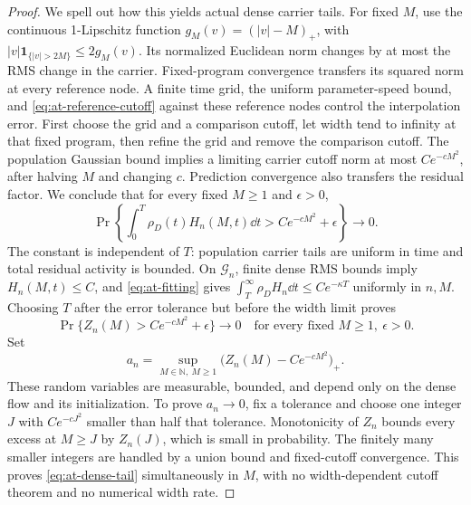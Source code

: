 \begin{proof}
We spell out how this yields actual dense carrier tails.  For fixed
$M$, use the continuous 1-Lipschitz function
$g_M(v)=(|v|-M)_+$, with
$|v|\mathbf1_{\{|v|>2M\}}\le2g_M(v)$.
Its normalized Euclidean norm changes by at most the RMS change in
the carrier.  Fixed-program convergence transfers its squared norm at
every reference node.  A finite time grid, the uniform parameter-speed
bound, and \eqref{eq:at-reference-cutoff} against these reference nodes
control the interpolation error.  First choose the grid and a comparison
cutoff, let width tend to infinity at that fixed program, then refine
the grid and remove the comparison cutoff.  The population Gaussian
bound implies a limiting carrier cutoff norm at most $Ce^{-cM^2}$,
after halving $M$ and changing $c$.  Prediction convergence also
transfers the residual factor.  We conclude that for every fixed
$M\ge1$ and $\epsilon>0$,
\[
 \Pr\left\{\int_0^T\rho_D(t)H_n(M,t)\dd t
                   >Ce^{-cM^2}+\epsilon\right\}\longrightarrow0.
\]
The constant is independent of $T$: population carrier tails are uniform
in time and total residual activity is bounded.
On $\mathcal G_n$, finite dense RMS bounds imply $H_n(M,t)\le C$,
and \eqref{eq:at-fitting} gives
$\int_T^\infty\rho_DH_n\dd t\le Ce^{-\kappa T}$
uniformly in $n,M$.  Choosing $T$ after the error tolerance but before
the width limit proves
\[
 \Pr\{Z_n(M)>Ce^{-cM^2}+\epsilon\}\longrightarrow0
 \quad\text{for every fixed }M\ge1,\ \epsilon>0.
\]
Set
\[
 a_n=\sup_{M\in\mathbb N,\ M\ge1}
                  \bigl(Z_n(M)-Ce^{-cM^2}\bigr)_+.
\]
These random variables are measurable, bounded, and depend only on the
dense flow and its initialization.  To prove $a_n\to0$, fix a tolerance
and choose one integer $J$ with $Ce^{-cJ^2}$ smaller than half that
tolerance.  Monotonicity of $Z_n$ bounds every excess at $M\ge J$
by $Z_n(J)$, which is small in probability.  The finitely many smaller
integers are handled by a union bound and fixed-cutoff convergence.
This proves \eqref{eq:at-dense-tail} simultaneously in $M$, with no
width-dependent cutoff theorem and no numerical width rate.
\end{proof}
